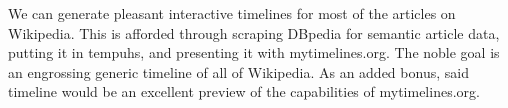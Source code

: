 We can generate pleasant interactive timelines for most of the articles on 
Wikipedia. This is afforded through scraping DBpedia for semantic article 
data, putting it in tempuhs, and presenting it with mytimelines.org. The noble 
goal is an engrossing generic timeline of all of Wikipedia. As an added bonus, 
said timeline would be an excellent preview of the capabilities of 
mytimelines.org.
